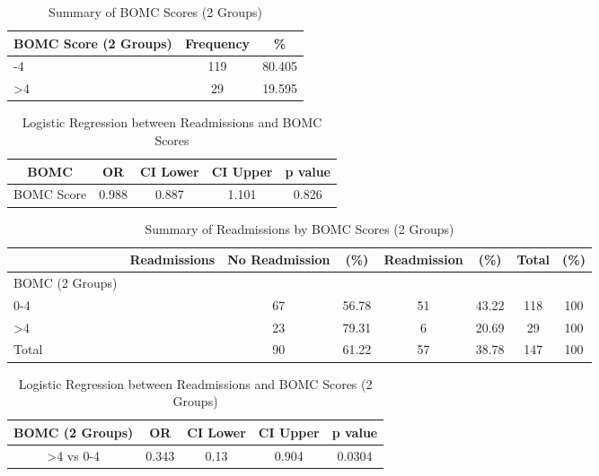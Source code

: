 \documentclass[12pt,]{article}
\begin{document}
\begin{table}[!h]

\caption{\label{tab:unnamed-chunk-25}Summary of BOMC Scores (2 Groups)}
\centering
\begin{tabular}{>{\centering\arraybackslash}p{5cm}cc}
\toprule
BOMC Score (2 Groups) & Frequency & \%\\
\midrule
0-4 & 119 & 80.405\\
\rowcolor[HTML]{E3E5E7}  >4 & 29 & 19.595\\
\bottomrule
\end{tabular}
\end{table}

\pagebreak

\begin{table}[!h]

\caption{\label{tab:unnamed-chunk-26}Logistic Regression between Readmissions and BOMC Scores}
\centering
\begin{tabular}{ccccc}
\toprule
BOMC & OR & CI Lower & CI Upper & p value\\
\midrule
\rowcolor{white}  BOMC Score & 0.988 & 0.887 & 1.101 & 0.826\\
\bottomrule
\end{tabular}
\end{table}

\begin{table}[!h]

\caption{\label{tab:unnamed-chunk-26}Summary of Readmissions by BOMC Scores (2 Groups)}
\centering
\begin{tabular}{>{\centering\arraybackslash}p{5cm}ccccccc}
\toprule
  & Readmissions & No Readmission & (\%) & Readmission & (\%) & Total & (\%)\\
\midrule
BOMC (2 Groups) &  &  &  &  &  &  & \\
\rowcolor[HTML]{E3E5E7}  0-4 &  & 67 & 56.78 & 51 & 43.22 & 118 & 100\\
>4 &  & 23 & 79.31 & 6 & 20.69 & 29 & 100\\
\rowcolor[HTML]{E3E5E7}  Total &  & 90 & 61.22 & 57 & 38.78 & 147 & 100\\
\bottomrule
\end{tabular}
\end{table}

\begin{table}[!h]

\caption{\label{tab:unnamed-chunk-26}Logistic Regression between Readmissions and BOMC Scores (2 Groups)}
\centering
\begin{tabular}{ccccc}
\toprule
BOMC (2 Groups) & OR & CI Lower & CI Upper & p value\\
\midrule
\rowcolor{white}  >4 vs 0-4 & 0.343 & 0.13 & 0.904 & 0.0304\\
\bottomrule
\end{tabular}
\end{table}
\end{document}
